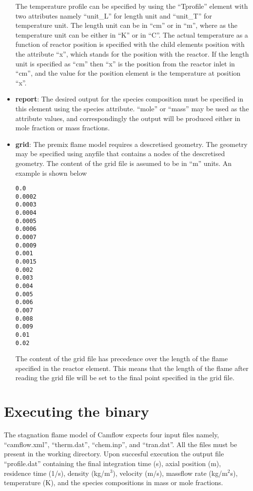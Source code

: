 \begin{itemize}
The temperature profile can be specified by using the ``Tprofile'' element with two attributes namely ``unit\_L'' for length unit and ``unit\_T'' for temperature unit. The length unit can be in ``cm'' or in ``m'', where as the temperature unit can be either in ``K'' or in ``C''. The actual temperature as a function of reactor position is specified with the child elements position with the attribute ``x'', which stands for the position with the reactor. If the length unit is specified as ``cm'' then ``x'' is the position from the reactor inlet in ``cm'', and the value for the position element is the temperature at position ``x''.

\item \textbf{report}: The desired output for the species composition must be specified in this element using the species attribute. ``mole'' or ``mass'' may be used as the attribute values, and correspondingly the output will be produced either in mole fraction or mass fractions.

\item \textbf{grid}: The premix flame model requires a descretised geometry. The geometry may be specified using anyfile that contains a nodes of the descretised geometry. The content of the grid file is assumed to be in ``m'' units. An example is shown below\\
{\scriptsize{\begin{verbatim}
0.0
0.0002
0.0003
0.0004
0.0005
0.0006
0.0007
0.0009
0.001
0.0015
0.002
0.003
0.004
0.005
0.006
0.007
0.008
0.009
0.01
0.02
\end{verbatim}
}}

The content of the grid file has precedence over the length of the flame specified in the reactor element. This means that the length of the flame after reading the grid file will be set to the final point specified in the grid file.
\end{itemize}

\section{Executing the binary}
The stagnation flame model of Camflow expects four input files namely, ``camflow.xml'', ``therm.dat'',  ``chem.inp'', and ``tran.dat''. All the files must be present in the working directory. Upon succesful execution the output file ``profile.dat'' containing the final integration time (s), axial position (m), residence time (1/s), density (kg/m$^3$), velocity (m/s), massflow rate (kg/m$^2$s), temperature (K), and the species compositions in mass or mole fractions.

%
%
%
